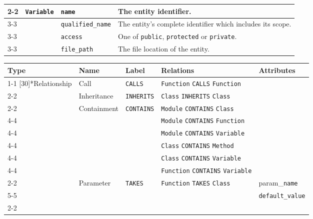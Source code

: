 \begin{tabularx}{\textwidth}{p{1.8cm}llX}
\cmidrule{2-2}\cmidrule{3-3}\cmidrule{4-4}
 & \multirow{4}[8]{*}{\texttt{Variable}} & \texttt{name} & The entity identifier. \\
\cmidrule{3-3}\cmidrule{4-4}
 &  & \texttt{qualified\_\texttt{name}} & The entity's complete identifier which includes its scope. \\
\cmidrule{3-3}\cmidrule{4-4}
 &  & \texttt{access} & One of \texttt{public}, \texttt{protected} or \texttt{private}. \\
\cmidrule{3-3}\cmidrule{4-4}
 &  & \texttt{file\_path} & The file location of the entity. \\
\bottomrule
\end{tabularx}

\begin{tabularx}{\textwidth}{p{1.8cm}llXl}
\toprule
\textbf{Type} & \textbf{Name} & \textbf{Label} & \textbf{Relations} & \textbf{Attributes} \\
\cmidrule{1-1}\cmidrule{2-2}\cmidrule{3-3}\cmidrule{4-4}\cmidrule{5-5}
\multirow{15}[30]{*}{Relationship} & Call & \texttt{CALLS} & \texttt{Function} \texttt{CALLS} \texttt{Function} &  \\
\cmidrule{2-2}\cmidrule{3-3}\cmidrule{4-4}
 & Inheritance & \texttt{INHERITS} & \texttt{Class} \texttt{INHERITS} \texttt{Class} &  \\
\cmidrule{2-2}\cmidrule{3-3}\cmidrule{4-4}
 & \multirow{6}[12]{*}{Containment} & \multirow{6}[12]{*}{\texttt{CONTAINS}} & \texttt{Module} \texttt{CONTAINS} \texttt{Class} &  \\
\cmidrule{4-4}
 &  &  & \texttt{Module} \texttt{CONTAINS} \texttt{Function} &  \\
\cmidrule{4-4}
 &  &  & \texttt{Module} \texttt{CONTAINS} \texttt{Variable} &  \\
\cmidrule{4-4}
 &  &  & \texttt{Class} \texttt{CONTAINS} \texttt{Method} &  \\
\cmidrule{4-4}
 &  &  & \texttt{Class} \texttt{CONTAINS} \texttt{Variable} &  \\
\cmidrule{4-4}
 &  &  & \texttt{Function} \texttt{CONTAINS} \texttt{Variable} &  \\
\cmidrule{2-2}\cmidrule{3-3}\cmidrule{4-4}\cmidrule{5-5}
 & \multirow{2}[4]{*}{Parameter} & \multirow{2}[4]{*}{\texttt{TAKES}} & \multirow{2}[4]{*}{\texttt{Function} \texttt{TAKES} \texttt{Class}} & param\_\texttt{name} \\
\cmidrule{5-5}
 &  &  &  & \texttt{default\_value} \\
\cmidrule{2-2}\cmidrule{3-3}\cmidrule{4-4}\cmidrule{5-5}

\end{tabularx}
